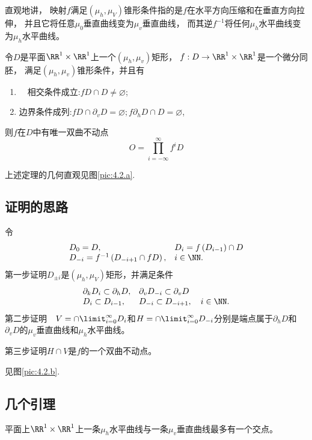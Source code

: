 直观地讲，
映射$f$满足$(\mu_h,\mu_V)$锥形条件指的是$f$在水平方向压缩和在垂直方向拉伸，
并且它将任意$\mu_0$垂直曲线变为$\mu_v$垂直曲线，
而其逆$f^{-1}$将任何$\mu_h$水平曲线变为$\mu_h$水平曲线。
\begin{theorem} [双曲不动点定理]
  令$D$是平面$\RR^1 \times \RR^1$上一个$(\mu_h,\mu_v)$矩形，
  $f:D\to \RR^1\times\RR^1$是一个微分同胚，
  满足$(\mu_h,\mu_v)$锥形条件，并且有
  \begin{enumerate}
  \item　相交条件成立:$f D \cap D \neq \varnothing$;
  \item  边界条件成列:$f D \cap \partial_{v} D=\varnothing;f \partial_{h} D \cap D=\varnothing$,
  \end{enumerate}
  则$f$在$D$中有唯一双曲不动点
$$
O=\prod_{i=-\infty}^{\infty} f^{i} D
$$
\end{theorem}
上述定理的几何直观见图\ref{pic:4.2.a}.
\subsection{证明的思路}
令
\begin{equation}
  \label{eq:4.1.1}
\begin{array}{ll}{D_{0}=D,} & {D_{i}=f\left(D_{i-1}\right) \cap D} \\ {D_{-i}=f^{-1}\left(D_{-i+1} \cap f D\right),} & {i \in \NN}.\end{array}
\end{equation}
第一步证明$D_{\pm i}$是$(\mu_h,\mu_V)$矩形，并满足条件
\begin{equation}
  \label{eq:4.1.2}
\begin{array}{ll}{\partial_{k} D_{i} \subset \partial_{h} D,} & {\partial_{v} D_{-i} \subset \partial_{v} D} \\ {D_{i} \subset D_{i-1},} & {D_{-i} \subset D_{-i+1}, \quad i \in \NN}.\end{array}
\end{equation}
第二步证明　$V=\cap\limit_{i=0}^{\infty}D_i$和$H=\cap\limit_{i=0}^{\infty}D_{-i}$分别是端点属于$\partial_hD$和$\partial_vD$的$\mu_v$垂直曲线和$\mu_h$水平曲线。
\par
第三步证明$H\cap V$是$f$的一个双曲不动点。
\par
见图\ref{pic:4.2.b}.
\subsection{几个引理}
\begin{corollary}
  \label{col:4.1.6}
平面上$\RR^1\times \RR^1$上一条$\mu_h$水平曲线与一条$\mu_v$垂直曲线最多有一个交点。
\end{corollary}

